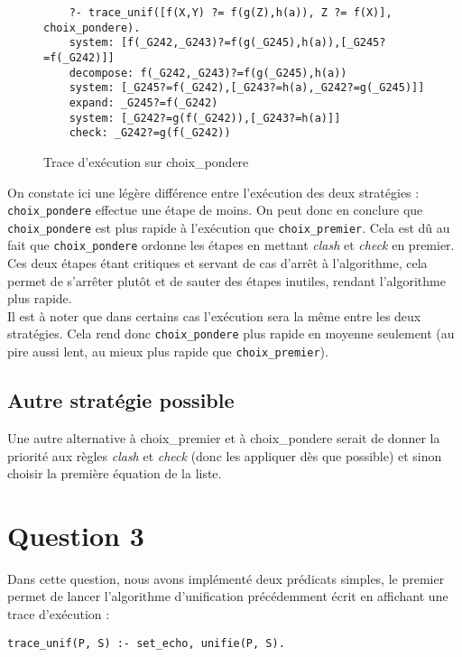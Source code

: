 \documentclass[12pt]{article} %
\begin{document}
\begin{figure}[h!]
	\begin{verbatim}
	?- trace_unif([f(X,Y) ?= f(g(Z),h(a)), Z ?= f(X)], choix_pondere).
	system: [f(_G242,_G243)?=f(g(_G245),h(a)),[_G245?=f(_G242)]]
	decompose: f(_G242,_G243)?=f(g(_G245),h(a))
	system: [_G245?=f(_G242),[_G243?=h(a),_G242?=g(_G245)]]
	expand: _G245?=f(_G242)
	system: [_G242?=g(f(_G242)),[_G243?=h(a)]]
	check: _G242?=g(f(_G242))
	\end{verbatim}
	\caption{Trace d'exécution sur choix\_pondere}
\end{figure}

On constate ici une légère différence entre l'exécution des deux stratégies : \verb|choix_pondere| effectue une étape de moins. On peut donc en conclure que \verb|choix_pondere| est plus rapide à l'exécution que \verb|choix_premier|. Cela est dû au fait que \verb|choix_pondere| ordonne les étapes en mettant \textit{clash} et \textit{check} en premier. Ces deux étapes étant critiques et servant de cas d'arrêt à l'algorithme, cela permet de s'arrêter plutôt et de sauter des étapes inutiles, rendant l'algorithme plus rapide.\\
Il est à noter que dans certains cas l'exécution sera la même entre les deux stratégies. Cela rend donc \verb|choix_pondere| plus rapide en moyenne seulement (au pire aussi lent, au mieux plus rapide que \verb|choix_premier|).\\

\subsection*{Autre stratégie possible}

Une autre alternative à choix\_premier et à choix\_pondere serait de donner la priorité aux règles \textit{clash} et \textit{check} (donc les appliquer dès que possible) et sinon choisir la première équation de la liste.

\section*{Question 3}

Dans cette question, nous avons implémenté deux prédicats simples, le premier permet de lancer l'algorithme d'unification précédemment écrit en affichant une trace d'exécution :

\begin{center}
\verb|trace_unif(P, S) :- set_echo, unifie(P, S).|
\end{center}
\end{document}
